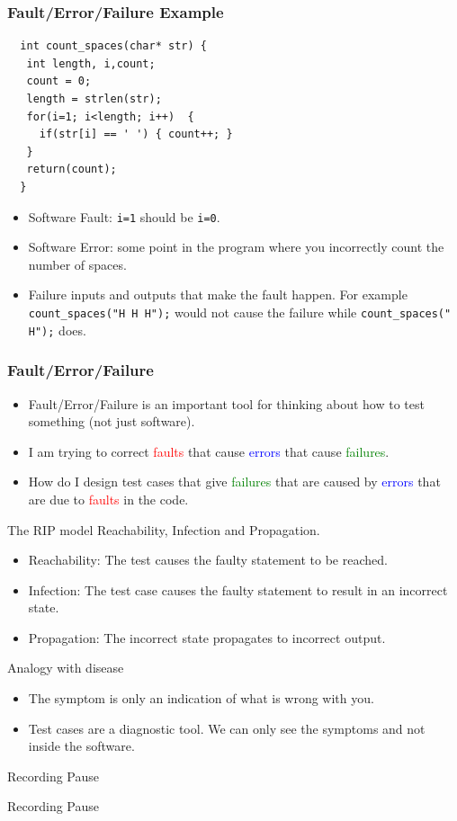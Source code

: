 \documentclass{beamer}
\begin{document}
\begin{frame}[fragile]
  \frametitle{Fault/Error/Failure Example}
\begin{lstlisting}
  int count_spaces(char* str) {
   int length, i,count;
   count = 0;
   length = strlen(str);
   for(i=1; i<length; i++)  { 
     if(str[i] == ' ') { count++; }
   }
   return(count);
  }
\end{lstlisting}
  \begin{itemize}
  \item Software Fault: {\tt i=1} should be {\tt i=0}.
  \item Software Error: some point in the program where you
    incorrectly count the number of spaces.
  \item Failure  inputs and outputs that make the fault happen. For
    example {\tt count\_spaces("H H H");} would not cause the failure
    while {\tt count\_spaces(" H");} does.
  \end{itemize}
\end{frame}
\begin{frame}
  \frametitle{Fault/Error/Failure}
  \begin{itemize}
  \item Fault/Error/Failure is an important tool for thinking about how to
    test something (not just software).
  \item I am trying to correct \textcolor{red}{faults} that cause
    \textcolor{blue}{errors} that cause \textcolor{green}{failures}.
  \item How do I design test cases that give  \textcolor{green}{failures} that
    are caused by  \textcolor{blue}{errors} that are due to
    \textcolor{red}{faults} in the code.
  \end{itemize}
\end{frame}

\begin{frame}{The RIP model}
 Reachability,  Infection and Propagation.
  \begin{itemize}
  \item Reachability: The test causes the faulty statement to be
    reached.
  \item Infection: The test case causes the faulty statement to result
    in an incorrect state.
  \item Propagation: The incorrect state propagates to incorrect output.
    \end{itemize}
  \end{frame}
  \begin{frame}{Analogy with disease}
    \begin{itemize}
    \item The symptom is only an indication of what is wrong with you.
    \item Test cases are a diagnostic tool. We can only see the
      symptoms and not inside the software. 
    \end{itemize}    
  \end{frame}
\begin{frame}{Recording Pause}
  \begin{center}
    Recording Pause
  \end{center}
\end{frame}
\end{document}
